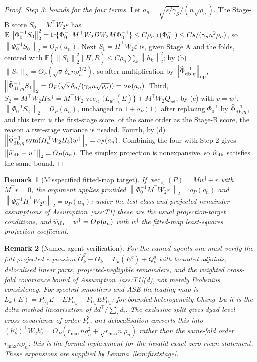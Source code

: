 \documentclass[12pt]{article}
\newtheorem{remark}{Remark}
\newcommand{\E}{\mathbb{E}}
\newcommand{\1}{\mathbf{1}}
\newcommand{\norm}[1]{\left\lVert#1\right\rVert}
\providecommand{\op}{\operatorname{op}}
\providecommand{\sym}{\operatorname{sym}}
\begin{document}
\begin{proof}
\emph{Step 3: bounds for the four terms.} Let $a_n=\sqrt{s/\gamma_S}/(n\sqrt{\rho_n})$. The Stage-B
score $S_0=M^\top W_2\varepsilon$ has $\E\norm{\Phi_0^{-1}S_0}_2^2={\rm tr}\{\Phi_0^{-1}M^\top
W_2DW_2M\Phi_0^{-1}\}\le C\rho_n{\rm tr}(\Phi_0^{-1})\le Cs/(\gamma_S n^2\rho_n)$, so
$\norm{\Phi_0^{-1}S_0}_2=O_P(a_n)$. Next $S_1=\bar H^\top W_2\varepsilon$ is, given Stage A and the
folds, centred with $\E(\norm{S_1}_2^2\mid H,R)\le C\rho_n\sum_k\norm{\bar h_k}_2^2$; by (b)
$\norm{S_1}_2=O_P(\sqrt s\,\delta_n n\rho_n^{3/2})$, so after multiplication by $\norm{\widehat\Phi_{{\rm
db},\eta}^{-1}}_{\op}$, $\norm{\widehat\Phi_{{\rm db},\eta}^{-1}S_1}_2=O_P(\sqrt s\,\delta_n/(\gamma_S
n\sqrt{\rho_n}))=o_P(a_n)$. Third, $S_2=M^\top W_2\bar Hw^\dagger=M^\top
W_2\operatorname{vec}_<\{L_{w^\dagger}(\bar E)\}+M^\top W_2\bar Q_{w^\dagger}$; by (c) with
$v=w^\dagger$, $\norm{\Phi_0^{-1}S_2}_2=O_P(a_n)$, unchanged to $1+o_P(1)$ after replacing
$\Phi_0^{-1}$ by $\widehat\Phi_{{\rm db},\eta}^{-1}$, and this term is the first-stage score, of the
same order as the Stage-B score, the reason a two-stage variance is needed. Fourth, by (d)
$\norm{\widehat\Phi_{{\rm db},\eta}^{-1}\sym(H_a^\top W_2H_b)w^\dagger}_2=o_P(a_n)$. Combining the
four with Step 2 gives $\norm{\widetilde w_{\rm db}-w^\dagger}_2=O_P(a_n)$. The simplex projection
is nonexpansive, so $\widehat w_{\rm db}$ satisfies the same bound.
\end{proof}

\begin{remark}[Misspecified fitted-map target]
\label{rem:T1-misspec}
If $\operatorname{vec}_<(P)=Mw^\dagger+r$ with $M^\top r=0$, the argument applies provided
$\norm{\Phi_0^{-1}M^\top W_2r}_2=o_P(a_n)$ and $\norm{\Phi_0^{-1}\bar H^\top W_2r}_2=o_P(a_n)$;
under the test-class and projected-remainder assumptions of Assumption~\ref{ass:T1} these are the
usual projection-target conditions, and $\widetilde w_{\rm db}-w^\dagger=O_P(a_n)$ with $w^\dagger$
the fitted-map least-squares projection coefficient.
\end{remark}

\begin{remark}[Named-agent verification]
For the named agents one must verify the full projected expansion $\widehat
G_k^g-G_k=L_k(E^g)+Q_k^g$ with bounded adjoints, delocalised linear parts, projected-negligible
remainders, and the weighted cross-fold covariance bound of Assumption~\ref{ass:T1}(d), not merely
Frobenius consistency. For spectral smoothers and ASE the leading map is $L_k(E)=P_{U_k}E+EP_{U_k}-P_{U_k}EP_{U_k}$;
for bounded-heterogeneity Chung--Lu it is the delta-method linearisation of $dd^\top/\sum_id_i$. The
exclusive split gives dyad-level cross-covariance of order $P_e^2$, and delocalisation converts this
into $(h_k^a)^\top W_2h_\ell^b=O_P(r_{\max}n\rho_n^2+\sqrt{r_{\max}n}\rho_n)$ rather than the
same-fold order $r_{\max}n\rho_n$; this is the formal replacement for the invalid exact-zero-mean
statement. These expansions are supplied by Lemma~\ref{lem:firststage}.
\end{remark}
\end{document}
